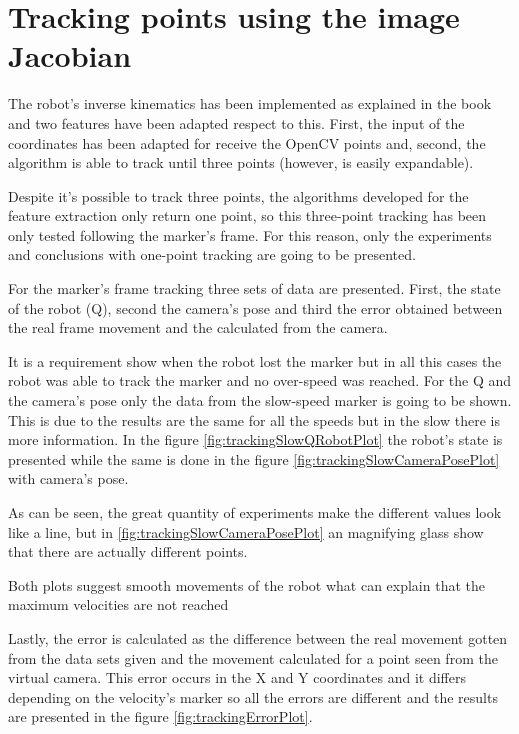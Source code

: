 

\chapter{Tracking points using the image Jacobian} %
\label{chap:tracking_points_using_the_image_jacobian}
The robot's inverse kinematics has been implemented as explained in the book and two features have been adapted respect to this. 
First, the input of the coordinates has been adapted for receive the OpenCV points and, second, the algorithm is able to track until three points (however, is easily expandable).

Despite it's possible to track three points, the algorithms developed for the feature extraction only return one point, so this three-point tracking has been only tested following the marker's frame. 
For this reason, only the experiments and conclusions with one-point tracking are going to be presented.

For the marker's frame tracking three sets of data are presented. 
First, the state of the robot (Q), second the camera's pose and third the error obtained between the real frame movement and the calculated from the camera.

It is a requirement show when the robot lost the marker but in all this cases the robot was able to track the marker and no over-speed was reached. 
For the Q and the camera's pose only the data from the slow-speed marker is going to be shown. 
This is due to the results are the same for all the speeds but in the slow there is more information.
In the figure \ref{fig:trackingSlowQRobotPlot} the robot's state is presented while the same is done in the figure \ref{fig:trackingSlowCameraPosePlot} with camera's pose.

	\ifx \plots \yes
		\trackingSlowQRobotPlot 
	\fi
	\ifx \plots \yes
		\trackingSlowCameraPosePlot 
	\fi

As can be seen, the great quantity of experiments make the different values look like a line, but in \ref{fig:trackingSlowCameraPosePlot} an magnifying glass show that there are actually different points.

Both plots suggest smooth movements of the robot what can explain that the maximum velocities are not reached

Lastly, the error is calculated as the difference between the real movement gotten from the data sets given and the movement calculated for a point seen from the virtual camera.
This error occurs in the X and Y coordinates and it differs depending on the velocity's marker so all the errors are different and the results are presented in the figure \ref{fig:trackingErrorPlot}.

